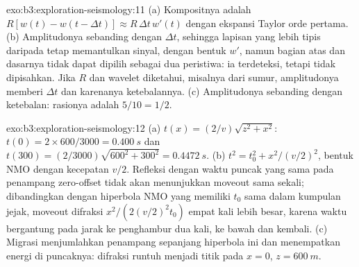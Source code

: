 \begin{solution}{exo:b3:exploration-seismology:11}
(a) Kompositnya adalah $R[w(t) - w(t - \Delta t)] \approx R\,\Delta t\,w'(t)$ dengan
ekspansi Taylor orde pertama. (b) Amplitudonya sebanding dengan
$\Delta t$, sehingga lapisan yang lebih tipis daripada  tetap memantulkan sinyal,
dengan bentuk $w'$, namun bagian atas dan dasarnya tidak dapat dipilih sebagai dua peristiwa: ia
terdeteksi, tetapi tidak dipisahkan. Jika $R$ dan wavelet diketahui, misalnya dari
sumur, amplitudonya memberi $\Delta t$ dan karenanya ketebalannya. (c) Amplitudonya
sebanding dengan ketebalan: rasionya adalah $5/10 = 1/2$.
\end{solution}

\begin{solution}{exo:b3:exploration-seismology:12}
(a) $t(x) = (2/v)\sqrt{z^2 + x^2}$: $t(0) = 2\times600/3000 = \qty{0.400}{s}$ dan
$t(300) = (2/3000)\sqrt{600^2 + 300^2} = \qty{0.4472}{s}$. (b) $t^2 = t_0^2 +
x^2/(v/2)^2$, bentuk NMO dengan kecepatan $v/2$. Refleksi dengan waktu
puncak yang sama pada penampang zero-offset tidak akan menunjukkan moveout sama sekali; dibandingkan
dengan hiperbola NMO yang memiliki $t_0$ sama dalam kumpulan jejak, moveout difraksi
$x^2/(2(v/2)^2t_0)$ empat kali lebih besar, karena waktu bergantung pada
jarak ke penghambur dua kali, ke bawah dan kembali. (c) Migrasi menjumlahkan
penampang sepanjang hiperbola ini dan menempatkan energi di puncaknya: difraksi
runtuh menjadi titik pada $x = 0$, $z = \qty{600}{m}$.
\end{solution}

